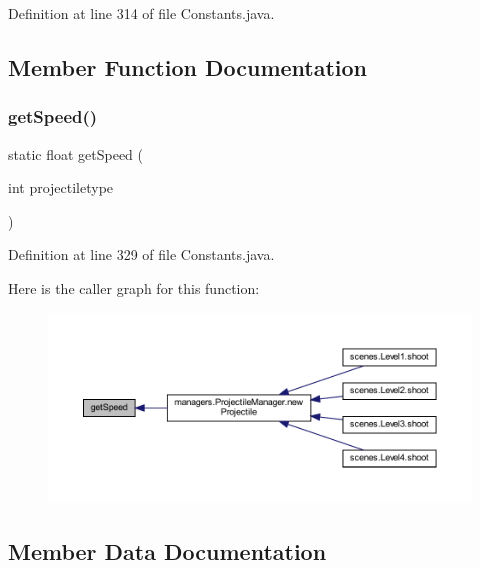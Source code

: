 Definition at line 314 of file Constants.\+java.



\subsection{Member Function Documentation}
\mbox{\label{classhelpz_1_1_constants_1_1_projectiles_a28b031e39773be6063f30deedbaad662}} 
\subsubsection{\texorpdfstring{get\+Speed()}{getSpeed()}}
{\footnotesize\ttfamily static float get\+Speed (\begin{DoxyParamCaption}\item[{int}]{projectiletype }\end{DoxyParamCaption})\hspace{0.3cm}{\ttfamily [static]}}



Definition at line 329 of file Constants.\+java.

Here is the caller graph for this function\+:\nopagebreak
\begin{figure}[H]
\begin{center}
\leavevmode
\includegraphics[width=350pt]{classhelpz_1_1_constants_1_1_projectiles_a28b031e39773be6063f30deedbaad662_icgraph}
\end{center}
\end{figure}


\subsection{Member Data Documentation}
\mbox{\label{classhelpz_1_1_constants_1_1_projectiles_aeedf9679be641870b99cd19b9bdcee1c}} 
